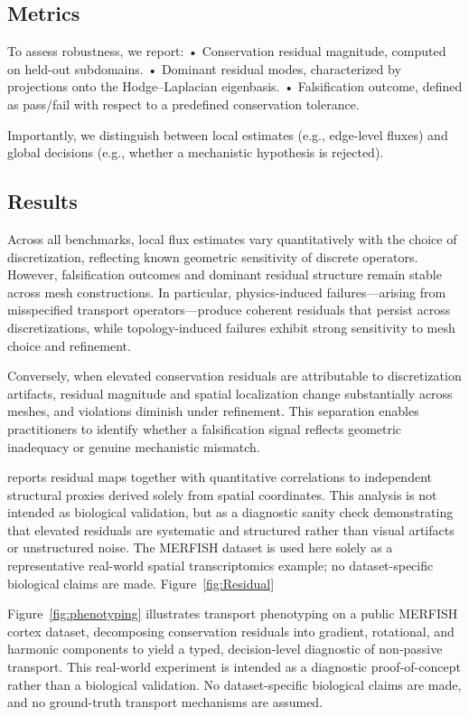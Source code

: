 \documentclass[10pt,article]{article}
\begin{document}
\subsection{Metrics}

To assess robustness, we report:
	•	Conservation residual magnitude, computed on held-out subdomains.
	•	Dominant residual modes, characterized by projections onto the Hodge–Laplacian eigenbasis.
	•	Falsification outcome, defined as pass/fail with respect to a predefined conservation tolerance.

Importantly, we distinguish between local estimates (e.g., edge-level fluxes) and global decisions (e.g., whether a mechanistic hypothesis is rejected).

\subsection{Results}

Across all benchmarks, local flux estimates vary quantitatively with the choice of discretization, reflecting known geometric sensitivity of discrete operators. However, falsification outcomes and dominant residual structure remain stable across mesh constructions. In particular, physics-induced failures—arising from misspecified transport operators—produce coherent residuals that persist across discretizations, while topology-induced failures exhibit strong sensitivity to mesh choice and refinement. 

Conversely, when elevated conservation residuals are attributable to discretization artifacts, residual magnitude and spatial localization change substantially across meshes, and violations diminish under refinement. This separation enables practitioners to identify whether a falsification signal reflects geometric inadequacy or genuine mechanistic mismatch.

reports residual maps together with quantitative correlations to independent structural proxies derived solely from spatial coordinates. This analysis is not intended as biological validation, but as a diagnostic sanity check demonstrating that elevated residuals are systematic and structured rather than visual artifacts or unstructured noise. The MERFISH dataset is used here solely as a representative real-world spatial transcriptomics example; no dataset-specific biological claims are made. Figure~\ref{fig:Residual}

Figure~\ref{fig:phenotyping} illustrates transport phenotyping on a public MERFISH cortex dataset, decomposing conservation residuals into gradient, rotational, and harmonic components to yield a typed, decision-level diagnostic of non-passive transport.
This real-world experiment is intended as a diagnostic proof-of-concept rather than a biological validation. No dataset-specific biological claims are made, and no ground-truth transport mechanisms are assumed.
\end{document}
